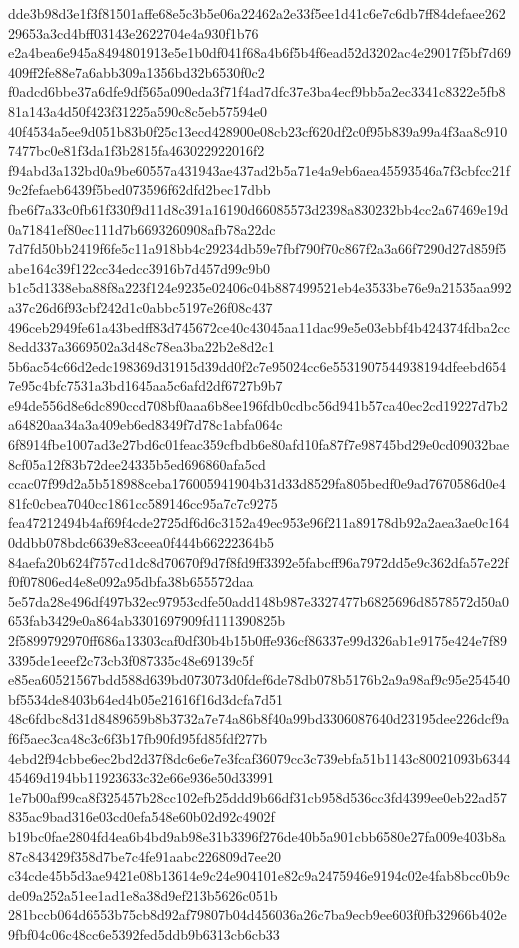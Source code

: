 \documentclass[11pt,a4paper]{article}
\begin{document}
{dde3b98d3e1f3f81501affe68e5c3b5e06a22462a2e33f5ee1d41c6e7c6db7ff84defaee26229653a3cd4bff03143e2622704e4a930f1b76
e2a4bea6e945a8494801913e5e1b0df041f68a4b6f5b4f6ead52d3202ac4e29017f5bf7d69409ff2fe88e7a6abb309a1356bd32b6530f0c2
f0adcd6bbe37a6dfe9df565a090eda3f71f4ad7dfc37e3ba4ecf9bb5a2ec3341c8322e5fb881a143a4d50f423f31225a590c8c5eb57594e0
40f4534a5ee9d051b83b0f25c13ecd428900e08cb23cf620df2c0f95b839a99a4f3aa8c9107477bc0e81f3da1f3b2815fa463022922016f2
f94abd3a132bd0a9be60557a431943ae437ad2b5a71e4a9eb6aea45593546a7f3cbfcc21f9c2fefaeb6439f5bed073596f62dfd2bec17dbb
fbe6f7a33c0fb61f330f9d11d8c391a16190d66085573d2398a830232bb4cc2a67469e19d0a71841ef80ec111d7b6693260908afb78a22dc
7d7fd50bb2419f6fe5c11a918bb4c29234db59e7fbf790f70c867f2a3a66f7290d27d859f5abe164c39f122cc34edcc3916b7d457d99c9b0
b1c5d1338eba88f8a223f124e9235e02406c04b887499521eb4e3533be76e9a21535aa992a37c26d6f93cbf242d1c0abbc5197e26f08c437
496ceb2949fe61a43bedff83d745672ce40c43045aa11dac99e5e03ebbf4b424374fdba2cc8edd337a3669502a3d48c78ea3ba22b2e8d2c1
5b6ac54c66d2edc198369d31915d39dd0f2c7e95024cc6e5531907544938194dfeebd6547e95c4bfc7531a3bd1645aa5c6afd2df6727b9b7
e94de556d8e6dc890ccd708bf0aaa6b8ee196fdb0cdbc56d941b57ca40ec2cd19227d7b2a64820aa34a3a409eb6ed8349f7d78c1abfa064c
6f8914fbe1007ad3e27bd6c01feac359cfbdb6e80afd10fa87f7e98745bd29e0cd09032bae8cf05a12f83b72dee24335b5ed696860afa5cd
ccac07f99d2a5b518988ceba176005941904b31d33d8529fa805bedf0e9ad7670586d0e481fc0cbea7040cc1861cc589146cc95a7c7c9275
fea47212494b4af69f4cde2725df6d6c3152a49ec953e96f211a89178db92a2aea3ae0c1640ddbb078bdc6639e83ceea0f444b66222364b5
84aefa20b624f757cd1dc8d70670f9d7f8fd9ff3392e5fabcff96a7972dd5e9c362dfa57e22ff0f07806ed4e8e092a95dbfa38b655572daa
5e57da28e496df497b32ec97953cdfe50add148b987e3327477b6825696d8578572d50a0653fab3429e0a864ab3301697909fd111390825b
2f5899792970ff686a13303caf0df30b4b15b0ffe936cf86337e99d326ab1e9175e424e7f893395de1eeef2c73cb3f087335c48e69139c5f
e85ea60521567bdd588d639bd073073d0fdef6de78db078b5176b2a9a98af9c95e254540bf5534de8403b64ed4b05e21616f16d3dcfa7d51
48c6fdbc8d31d8489659b8b3732a7e74a86b8f40a99bd3306087640d23195dee226dcf9af6f5aec3ca48c3c6f3b17fb90fd95fd85fdf277b
4ebd2f94cbbe6ec2bd2d37f8dc6e6e7e3fcaf36079cc3c739ebfa51b1143c80021093b634445469d194bb11923633c32e66e936e50d33991
1e7b00af99ca8f325457b28cc102efb25ddd9b66df31cb958d536cc3fd4399ee0eb22ad57835ac9bad316e03cd0efa548e60b02d92c4902f
b19bc0fae2804fd4ea6b4bd9ab98e31b3396f276de40b5a901cbb6580e27fa009e403b8a87c843429f358d7be7c4fe91aabc226809d7ee20
c34cde45b5d3ae9421e08b13614e9c24e904101e82c9a2475946e9194c02e4fab8bcc0b9cde09a252a51ee1ad1e8a38d9ef213b5626c051b
281bccb064d6553b75cb8d92af79807b04d456036a26c7ba9ecb9ee603f0fb32966b402e9fbf04c06c48cc6e5392fed5ddb9b6313cb6cb33
}
\end{document}
